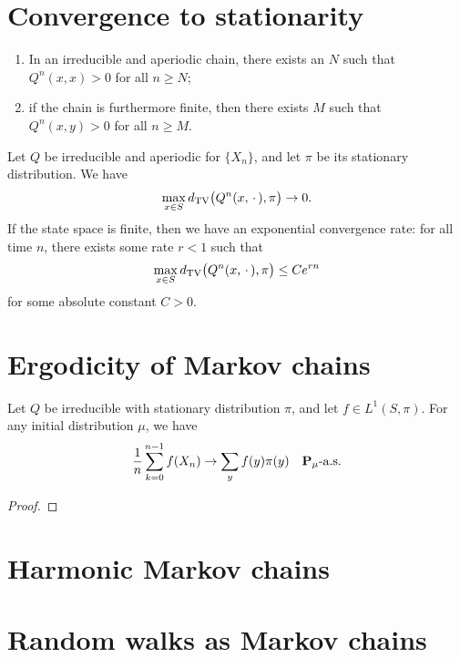 \documentclass[10pt]{book}
\begin{document}
\section{Convergence to stationarity}

\begin{prop} \leavevmode
    \begin{enumerate}
        \item In an irreducible and aperiodic chain, there exists an $N$ such that $Q^n(x,x) > 0$ for all $n \geq N$;
        \item if the chain is furthermore finite, then there exists $M$ such that $Q^n(x,y) > 0$ for all $n \geq M$.
    \end{enumerate}
\end{prop}

\begin{namedthm}
    Let $Q$ be irreducible and aperiodic for $\{X_n\}$, and let $\pi$ be its stationary distribution. We have \[ 
        \max_{x\in S}d_{\mathrm{TV}}\bigl(Q^n(x, \,\cdot\,),\pi\bigr) \to 0.
    \]
    If the state space is finite, then we have an exponential convergence rate: for all time $n$, there exists some rate $r<1$ such that \[
        \max_{x\in S}d_{\mathrm{TV}}\bigl(Q^n(x, \,\cdot\,),\pi\bigr) \leq Ce^{rn}
    \] for some absolute constant $C > 0$.
    
\end{namedthm}

\section{Ergodicity of Markov chains}

\begin{namedthm}
    Let $Q$ be irreducible with stationary distribution $\pi$, and let $f \in L^1(S,\pi)$. For any initial distribution $\mu$, we have \[
        \frac{1}{n} \sum_{k=0}^{n-1} f(X_n) \to \sum_y f(y) \pi(y)\quad \mathbf{P}_\mu\text{-a.s.}
    \]
\end{namedthm}
\begin{proof}
    
\end{proof}

\section{Harmonic Markov chains}

\section{Random walks as Markov chains}
\end{document}
